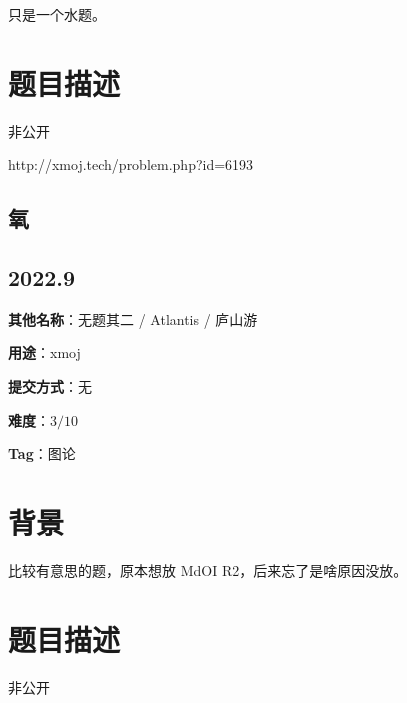 \documentclass[a4paper,10pt]{article}
\begin{document}
只是一个水题。

\section*{题目描述}

非公开

http://xmoj.tech/problem.php?id=6193

\newpage

\vspace*{\fill}
\begin{center}

\section{氧}

\subsection*{2022.9}

\vspace{10pt}

\textbf{其他名称}：无题其二 / Atlantis / 庐山游

\vspace{10pt}

\textbf{用途}：xmoj

\vspace{10pt}

\textbf{提交方式}：无

\vspace{10pt}

\textbf{难度}：$3/10$

\vspace{10pt}

\textbf{Tag}：图论

\end{center}
\vspace*{\fill}

\newpage

\section*{背景}

比较有意思的题，原本想放 MdOI R2，后来忘了是啥原因没放。

\section*{题目描述}

非公开
\end{document}
